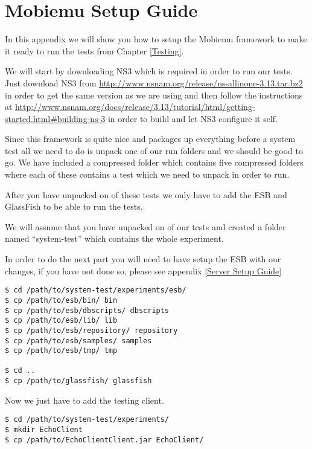 \section{Mobiemu Setup Guide}\label{Mobiemu Setup Guide}
In this appendix we will show you how to setup the Mobiemu framework to make it ready to run the tests from Chapter \ref{Testing}.

We will start by downloading NS3 which is required in order to run our tests. Just download NS3 from \url{http://www.nsnam.org/release/ns-allinone-3.13.tar.bz2} in order to get the same version as we are using and then follow the instructions at \url{http://www.nsnam.org/docs/release/3.13/tutorial/html/getting-started.html#building-ns-3} in order to build and let NS3 configure it self.

Since this framework is quite nice and packages up everything before a system test all we need to do is unpack one of our run folders and we should be good to go. We have included a compressed folder which contains five compressed folders where each of these contains a test which we need to unpack in order to run.

After you have unpacked on of these tests we only have to add the ESB and GlassFish to be able to run the tests.

We will assume that you have unpacked on of our tests and created a folder named “system-test” which contains the whole experiment.

\begin{shaded}
In order to do the next part you will need to have setup the ESB with our changes, if you have not done so, please see appendix \ref{Server Setup Guide}
\end{shaded}

\lstset{language=bash, style=bash}
\begin{lstlisting}[frame=single, caption={Copy ESB and GlassFish into System test}, label=mobiemu:copy esb, breaklines=true]
$ cd /path/to/system-test/experiments/esb/
$ cp /path/to/esb/bin/ bin
$ cp /path/to/esb/dbscripts/ dbscripts
$ cp /path/to/esb/lib/ lib
$ cp /path/to/esb/repository/ repository
$ cp /path/to/esb/samples/ samples
$ cp /path/to/esb/tmp/ tmp

$ cd ..
$ cp /path/to/glassfish/ glassfish
\end{lstlisting}

Now we just have to add the testing client.
\lstset{language=bash, style=bash}
\begin{lstlisting}[frame=single, caption={Adding the test client}, label=mobiemu:adding test client, breaklines=true]
$ cd /path/to/system-test/experiments/
$ mkdir EchoClient
$ cp /path/to/EchoClientClient.jar EchoClient/
\end{lstlisting}

